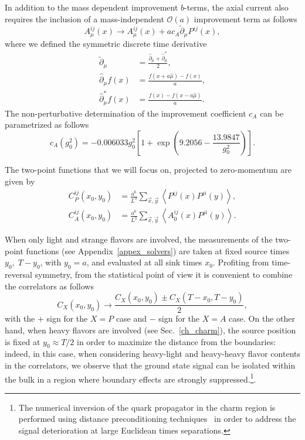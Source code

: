 In addition to the mass dependent improvement $b$-terms, the axial current also requires the inclusion of a mass-independent $\mathcal{O}(a)$ improvement term as follows
\begin{equation}
\label{ch_observables:eq:axial_impr}
A_{\mu}^{ij}(x)\rightarrow A_{\mu}^{ij}(x)+ac_A\tilde{\partial}_{\mu}P^{ij}(x),
\end{equation}
where we defined the symmetric discrete time derivative
\begin{align}
\tilde{\partial}_{\mu}&=\frac{\hat{\partial}_{\mu}+\hat{\partial}_{\mu}^*}{2},\\
\hat{\partial}_{\mu}f(x)&=\frac{f(x+a\hat{\mu})-f(x)}{a},\\
\hat{\partial}^*_{\mu}f(x)&=\frac{f(x)-f(x-a\hat{\mu})}{a}.
\end{align}
The non-perturbative determination of the improvement coefficient $c_A$ can be parametrized as follows ~\citep{Bulava:2015bxa}
\begin{equation}
c_A(g_0^2)=-0.006033g_0^2\left[1+\exp\left(9.2056-\frac{13.9847}{g_0^2}\right)\right].
\end{equation}

The two-point functions that we will focus on, projected to zero-momentum are given by
\begin{align}
\label{ch_observables:eq:corrs}
C_P^{ij}(x_0,y_0)&=\frac{a^6}{L^3}\sum_{\vec{x},\vec{y}}\left<P^{ij}(x)P^{ji}(y)\right>,\\
C_A^{ij}(x_0,y_0)&=\frac{a^6}{L^3}\sum_{\vec{x},\vec{y}}\left<A_0^{ij}(x)P^{ji}(y)\right>.
\end{align}

When only light and strange flavors are involved, the measurements of the two-point functions (see Appendix~\ref{appex_solvers}) are taken at fixed source times $y_0,\;T-y_0$, with $y_0=a$, and evaluated at all sink times $x_0$. Profiting from time-reversal symmetry, from the statistical point of view it is convenient to combine the correlators as follows
\begin{equation}
C_X(x_0,y_0)\to\frac{C_X(x_0,y_0)\pm C_X(T-x_0,T-y_0)}{2},
\end{equation}
with the $+$ sign for the $X=P$ case and $-$ sign for the $X=A$ case. On the other hand, when heavy flavors are involved (see Sec.~\ref{ch_charm}), the source position is fixed at $y_0\approx T/2$ in order to maximize the distance from the boundaries: indeed, in this case, when considering heavy-light and heavy-heavy flavor contents in the correlators, we observe that the ground state signal can be isolated within the bulk in a region where  boundary effects are strongly suppressed.\footnote{The numerical inversion of the quark propagator in the charm region is performed using distance preconditioning techniques~\cite{deDivitiis:2010ya,Collins:2017iud} in order to address  the signal deterioration at large Euclidean times separations.}.

